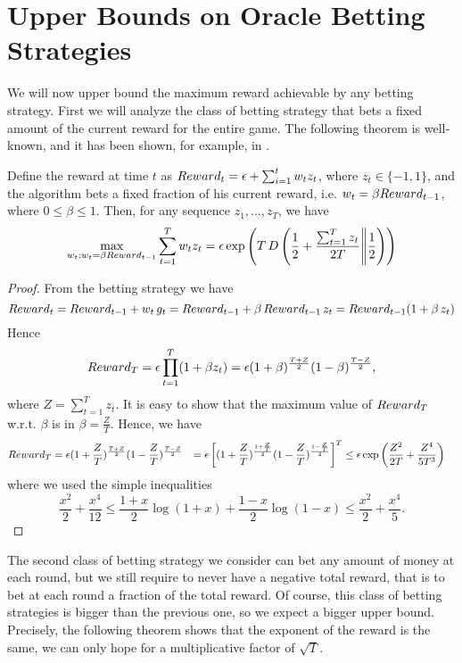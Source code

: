 \section{Upper Bounds on Oracle Betting Strategies}

We will now upper bound the maximum reward achievable by any betting strategy.
First we will analyze the class of betting strategy that bets a fixed amount of the current reward for the entire game.
The following theorem is well-known, and it has been shown, for example, in \cite{}.

\begin{theorem}
\label{thm:oracle_fraction}
Define the reward at time $t$ as $Reward_t=\epsilon + \sum_{i=1}^t w_t z_t$, where $z_t\in \{-1,1\}$, and the algorithm bets a fixed fraction of his current reward, i.e. $w_t=\beta Reward_{t-1}$, where $0\leq\beta\leq1$. Then, for any sequence $z_1, \ldots, z_T$, we have
\[
\max_{w_t: w_t=\beta Reward_{t-1}} \sum_{t=1}^T w_t z_t 
= \epsilon \exp\left(T\, D\left(\frac{1}{2}+\frac{\sum_{t=1}^T z_t}{2T}\middle\|\frac{1}{2}\right)\right) 
\]
\end{theorem}
\begin{proof}
From the betting strategy we have
\[
Reward_t=Reward_{t-1} + w_t \, g_t = Reward_{t-1} + \beta \, Reward_{t-1} \, z_t = Reward_{t-1} (1+\beta \, z_t)
\]
Hence
\[
Reward_T=\epsilon \prod_{t=1}^T (1+\beta z_t) = \epsilon (1+\beta)^\frac{T+Z}{2} (1-\beta)^\frac{T-Z}{2},
\]
where $Z=\sum_{t=1}^T z_t$.
It is easy to show that the maximum value of $Reward_T$ w.r.t. $\beta$ is in $\beta=\frac{Z}{T}$. 
Hence, we have
\begin{align}
Reward_T &= \epsilon (1+\frac{Z}{T})^\frac{T+Z}{2} (1-\frac{Z}{T})^\frac{T-Z}{2} 
&= \epsilon \left[(1+\frac{Z}{T})^\frac{1+\frac{Z}{T}}{2} (1-\frac{Z}{T})^\frac{1-\frac{Z}{T}}{2}\right]^T 
&\leq \epsilon \exp \left(\frac{Z^2}{2 T} + \frac{Z^4}{5 T^3}\right)
\end{align}
where we used the simple inequalities
\[
\frac{x^2}{2} +\frac{x^4}{12}\leq \frac{1+x}{2} \log(1+x) + \frac{1-x}{2}\log(1-x) \leq \frac{x^2}{2} + \frac{x^4}{5}.
\]
\end{proof}

The second class of betting strategy we consider can bet any amount of money at each round, but we still require to never have a negative total reward, that is to bet at each round a fraction of the total reward. Of course, this class of betting strategies is bigger than the previous one, so we expect a bigger upper bound. Precisely, the following theorem shows that the exponent of the reward is the same, we can only hope for a multiplicative factor of $\sqrt{T}$.

